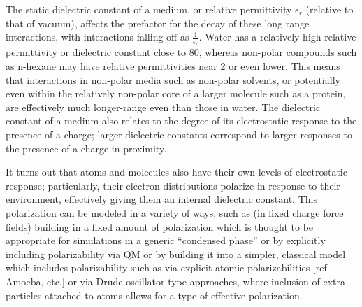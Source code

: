 \documentclass[9pt,bestpractices]{livecoms}
\begin{document}
The static dielectric constant of a medium, or relative permittivity
$\epsilon_r$ (relative to that of vacuum), affects the prefactor for the decay
of these long range interactions, with interactions falling off as
$\frac{1}{\epsilon_r}$.  Water has a relatively high relative permittivity or
dielectric constant close to 80, whereas non-polar compounds such as n-hexane
may have relative permittivities near 2 or even lower.  This means that
interactions in non-polar media such as non-polar solvents, or potentially even
within the relatively non-polar core of a larger molecule such as a protein, are
effectively much longer-range even than those in water.  The dielectric constant
of a medium also relates to the degree of its electrostatic response to the
presence of a charge; larger dielectric constants correspond to larger responses
to the presence of a charge in proximity.

It turns out that atoms and molecules also have their own levels of
electrostatic response; particularly, their electron distributions polarize in
response to their environment, effectively giving them an internal dielectric
constant.  This polarization can be modeled in a variety of ways, such as (in
fixed charge force fields) building in a fixed amount of polarization which is
thought to be appropriate for simulations in a generic ``condensed phase'' or by
explicitly including polarizability via QM or by building it into a simpler,
classical model which includes polarizability such as via explicit atomic
polarizabilities [ref Amoeba, etc.] or via Drude oscillator-type approaches,
where inclusion of extra particles attached to atoms allows for a type of
effective polarization.
\end{document}
